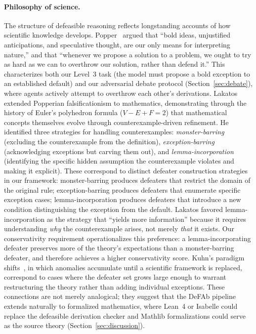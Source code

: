 \documentclass{article}
\theoremstyle{definition}
\begin{document}
\paragraph{Philosophy of science.} The structure of defeasible reasoning reflects longstanding accounts of how scientific knowledge develops. Popper~\cite{popper1959logic} argued that ``bold ideas, unjustified anticipations, and speculative thought, are our only means for interpreting nature,'' and that ``whenever we propose a solution to a problem, we ought to try as hard as we can to overthrow our solution, rather than defend it.'' This characterizes both our Level~3 task (the model must propose a bold exception to an established default) and our adversarial debate protocol (Section~\ref{sec:debate}), where agents actively attempt to overthrow each other's derivations. Lakatos~\cite{lakatos1976proofs} extended Popperian falsificationism to mathematics, demonstrating through the history of Euler's polyhedron formula ($V - E + F = 2$) that mathematical concepts themselves evolve through counterexample-driven refinement. He identified three strategies for handling counterexamples: \emph{monster-barring} (excluding the counterexample from the definition), \emph{exception-barring} (acknowledging exceptions but carving them out), and \emph{lemma-incorporation} (identifying the specific hidden assumption the counterexample violates and making it explicit). These correspond to distinct defeater construction strategies in our framework: monster-barring produces defeaters that restrict the domain of the original rule; exception-barring produces defeaters that enumerate specific exception cases; lemma-incorporation produces defeaters that introduce a new condition distinguishing the exception from the default. Lakatos favored lemma-incorporation as the strategy that ``yields more information'' because it requires understanding \emph{why} the counterexample arises, not merely \emph{that} it exists. Our conservativity requirement operationalizes this preference: a lemma-incorporating defeater preserves more of the theory's expectations than a monster-barring defeater, and therefore achieves a higher conservativity score. Kuhn's paradigm shifts~\cite{kuhn1962structure}, in which anomalies accumulate until a scientific framework is replaced, correspond to cases where the defeater set grows large enough to warrant restructuring the theory rather than adding individual exceptions. These connections are not merely analogical; they suggest that the DeFAb pipeline extends naturally to formalized mathematics, where Lean~4 or Isabelle could replace the defeasible derivation checker and Mathlib formalizations could serve as the source theory (Section~\ref{sec:discussion}).
\end{document}
